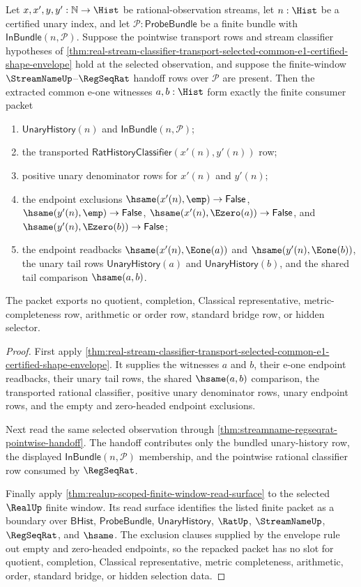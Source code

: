 \begin{theorem}
\label{thm:realup-streamname-regseqrat-common-eone-window-envelope}
Let $x,x',y,y':\mathbb{N}\to\Hist$ be rational-observation streams, let
$n:\Hist$ be a certified unary index, and let
$\mathcal{P}:\mathsf{ProbeBundle}$ be a finite bundle with
$\mathsf{InBundle}(n,\mathcal{P})$. Suppose the pointwise transport rows and
stream classifier hypotheses of
\autoref{thm:real-stream-classifier-transport-selected-common-e1-certified-shape-envelope}
hold at the selected observation, and suppose the finite-window
$\StreamNameUp$--$\RegSeqRat$ handoff rows over $\mathcal{P}$ are present.
Then the extracted common e-one witnesses $a,b:\Hist$ form exactly the finite
consumer packet
\begin{enumerate}
  \item $\mathsf{UnaryHistory}(n)$ and
  $\mathsf{InBundle}(n,\mathcal{P})$;
  \item the transported
  $\mathsf{RatHistoryClassifier}(x'(n),y'(n))$ row;
  \item positive unary denominator rows for $x'(n)$ and $y'(n)$;
  \item the endpoint exclusions
  $\hsame(x'(n),\emp)\to\mathsf{False}$,
  $\hsame(y'(n),\emp)\to\mathsf{False}$,
  $\hsame(x'(n),\Ezero(a))\to\mathsf{False}$, and
  $\hsame(y'(n),\Ezero(b))\to\mathsf{False}$;
  \item the endpoint readbacks $\hsame(x'(n),\Eone(a))$ and
  $\hsame(y'(n),\Eone(b))$, the unary tail rows
  $\mathsf{UnaryHistory}(a)$ and $\mathsf{UnaryHistory}(b)$, and the shared
  tail comparison $\hsame(a,b)$.
\end{enumerate}
The packet exports no quotient, completion, Classical representative,
metric-completeness row, arithmetic or order row, standard bridge row, or
hidden selector.
\end{theorem}
\begin{proof}
First apply
\autoref{thm:real-stream-classifier-transport-selected-common-e1-certified-shape-envelope}.
It supplies the witnesses $a$ and $b$, their e-one endpoint readbacks, their
unary tail rows, the shared $\hsame(a,b)$ comparison, the transported rational
classifier, positive unary denominator rows, unary endpoint rows, and the
empty and zero-headed endpoint exclusions.

Next read the same selected observation through
\autoref{thm:streamname-regseqrat-pointwise-handoff}. The handoff contributes
only the bundled unary-history row, the displayed
$\mathsf{InBundle}(n,\mathcal{P})$ membership, and the pointwise rational
classifier row consumed by $\RegSeqRat$.

Finally apply \autoref{thm:realup-scoped-finite-window-read-surface} to the
selected $\RealUp$ finite window. Its read surface identifies the listed
finite packet as a boundary over $\mathsf{BHist}$, $\mathsf{ProbeBundle}$,
$\mathsf{UnaryHistory}$, $\RatUp$, $\StreamNameUp$, $\RegSeqRat$, and
$\hsame$. The exclusion clauses supplied by the envelope rule out empty and
zero-headed endpoints, so the repacked packet has no slot for quotient,
completion, Classical representative, metric completeness, arithmetic, order,
standard bridge, or hidden selection data.
\end{proof}
